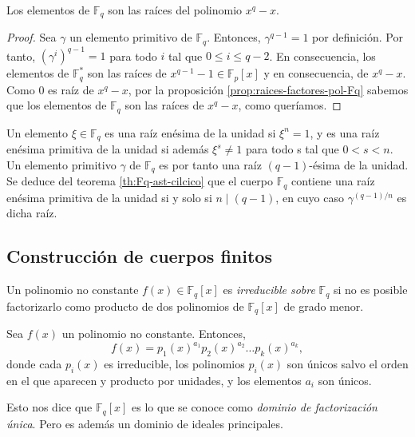 \begin{theorem}
  \label{th:el-Fq-raices-pol}
  Los elementos de \(\mathbb F_q\) son las raíces del polinomio \(x^q - x\).
\end{theorem}

\begin{proof}
  Sea \(\gamma\) un elemento primitivo de \(\mathbb F_q\).
  Entonces, \(\gamma^{q-1} = 1\) por definición.
  Por tanto, \((\gamma^i)^{q-1} = 1\) para todo \(i\) tal que \(0 \leq i \leq q - 2\).
  En consecuencia, los elementos de \(\mathbb F_q^*\) son las raíces de \(x^{q-1}-1 \in \mathbb F_p[x]\) y en consecuencia, de \(x^q - x\).
  Como \(0\) es raíz de \(x^q - x\), por la proposición \ref{prop:raices-factores-pol-Fq} sabemos que los elementos de \(\mathbb F_q\) son las raíces de \(x^q - x\), como queríamos.
\end{proof}

Un elemento \(\xi \in \mathbb F_q\) es una raíz enésima de la unidad si \(\xi^n = 1\), y es una raíz enésima primitiva de la unidad si además \(\xi^s \neq 1\) para todo s tal que \(0 < s < n\).
Un elemento primitivo \(\gamma\) de \(\mathbb F_q\) es por tanto una raíz \((q-1)\)-ésima de la unidad.
Se deduce del teorema \ref{th:Fq-ast-cilcico} que el cuerpo \(\mathbb F_q\) contiene una raíz enésima primitiva de la unidad si y solo si \(n \mid (q - 1)\), en cuyo caso \(\gamma^{(q-1)/n}\) es dicha raíz.


\subsection{Construcción de cuerpos finitos}

Un polinomio no constante \(f(x) \in \mathbb F_q[x]\) es \textit{irreducible sobre} \(\mathbb F_q\) si no es posible factorizarlo como producto de dos polinomios de \(\mathbb F_q[x]\) de grado menor.

\begin{theorem}
  Sea \(f(x)\) un polinomio no constante. Entonces, 
  \[
    f(x) = p_1(x)^{a_1}p_2(x)^{a_2}\dots p_k(x)^{a_k},
  \]
  donde cada \(p_i(x)\) es irreducible, los polinomios \(p_i(x)\) son únicos salvo el orden en el que aparecen y producto por unidades, y los elementos \(a_i\) son únicos.
\end{theorem}

Esto nos dice que \(\mathbb F_q[x]\) es lo que se conoce como \textit{dominio de factorización única}.
Pero es además un dominio de ideales principales.

